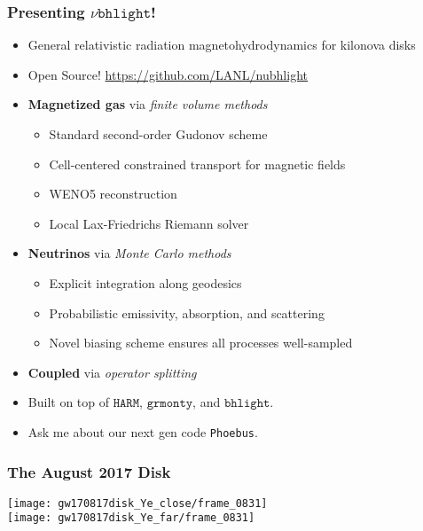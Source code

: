 \documentclass[]{beamer}
\begin{document}
\begin{frame}
  \frametitle{Presenting $\nu\texttt{bhlight}$!}
  \begin{itemize}
  \item General relativistic radiation magnetohydrodynamics for
    kilonova disks
  \item Open Source! {\color{blue}\url{https://github.com/LANL/nubhlight}}
  \item \textbf{Magnetized gas} via \textit{finite volume methods}
    \begin{itemize}
    \item Standard second-order Gudonov scheme
    \item Cell-centered constrained transport for magnetic fields
    \item WENO5 reconstruction
    \item Local Lax-Friedrichs Riemann solver
    \end{itemize}
  \item \textbf{Neutrinos} via \textit{Monte Carlo methods}
    \begin{itemize}
    \item Explicit integration along geodesics
    \item Probabilistic emissivity, absorption, and scattering
    \item Novel biasing scheme ensures all processes well-sampled
    \end{itemize}
  \item \textbf{Coupled} via \textit{operator splitting}
  \item Built on top of $\texttt{HARM}$, $\texttt{grmonty}$, and
    $\texttt{bhlight}$.
  \item Ask me about our next gen code {\tt Phoebus}.
  \end{itemize}
\end{frame}

\begin{frame}
  \frametitle{The August 2017 Disk}
  \begin{center}
    \texttt{[image: gw170817disk\_Ye\_close/frame\_0831]} \\
    \texttt{[image: gw170817disk\_Ye\_far/frame\_0831]} 
  \end{center}
\end{frame}
\end{document}
